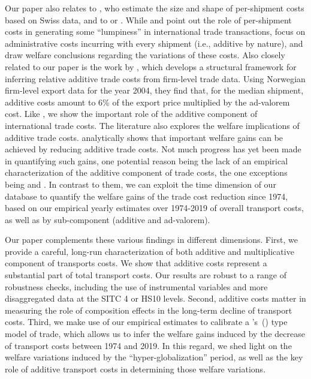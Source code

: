 \documentclass[a4paper,11pt]{article}
\newcommand\cites[1]{\citeauthor{#1}'s\ (\citeyear{#1})}
\begin{document}
Our paper also relates to \cite{Kropf-Saure-JIE-2016}, who estimate the size and shape of per-shipment costs based on Swiss data, and to \cite{Alessandria-et-al-AER-2010} or \cite{Hornok-et-al-RES-2015, Hornok-et-al-JIE-2015}. While \cite{Alessandria-et-al-AER-2010}  and \cite{Hornok-et-al-RES-2015} point out the role of per-shipment costs in generating some ``lumpiness'' in international trade transactions, \cite{Hornok-et-al-JIE-2015} focus on administrative costs incurring with every shipment (i.e., additive by nature), and draw welfare conclusions regarding the variations of these costs. Also closely related to our paper is the work by \cite{Irrazabal_2015}, which develops a structural framework for inferring relative additive trade costs from firm-level trade data. Using Norwegian firm-level export data for the year 2004, they find that, for the median shipment, additive costs amount to 6\% of the export price multiplied by the ad-valorem cost. Like \cite{Irrazabal_2015}, we show the important role of the additive component of international trade costs. The literature also explores the welfare implications of additive trade costs. \cite{sorensen2014} analytically shows that important welfare gains can be achieved by reducing additive trade costs. Not much progress has yet been made in quantifying such gains, one potential reason being the lack of an empirical characterization of the additive component of trade costs, the one exceptions being \cite{Irrazabal_2015} and \cite{Hornok-et-al-JIE-2015}. In contrast to them, we can exploit the time dimension of our database to quantify the welfare gains of the trade cost reduction since 1974, based on our empirical yearly estimates over 1974-2019 of overall transport costs, as well as by sub-component (additive and ad-valorem).\smallskip

Our paper complements these various findings in different dimensions. First, we provide a careful, long-run characterization of both additive and multiplicative component of transports costs. We show that additive costs represent a substantial part of total transport costs. Our results are robust to a range of robustness checks, including the use of instrumental variables and more disaggregated data at the SITC 4 or HS10 levels. Second, additive costs matter in measuring the role of composition effects in the long-term decline of transport costs. Third, we make use of our empirical estimates to calibrate a \cites{melitz} type model of trade, which allows us to infer the welfare gains induced by the decrease of transport costs between 1974 and 2019. In this regard, we shed light on the welfare variations induced by the ``hyper-globalization'' period, as well as the key role of additive transport costs in determining those welfare variations. \smallskip
\end{document}
